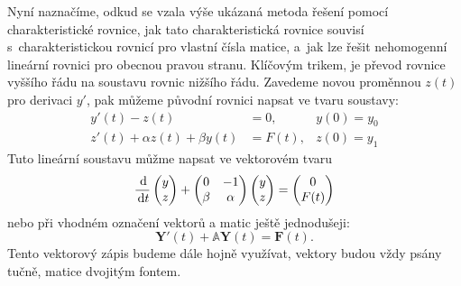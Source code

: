 \documentclass[a4paper, 12pt]{book}
\theoremstyle{definition}
\def\d{\,{\rm d}}               %
\def\vc#1{\mathbf{\boldsymbol{#1}}}     %
\def\tn#1{{\mathbb{#1}}}    %
\begin{document}
Nyní naznačíme, odkud se vzala výše ukázaná metoda řešení pomocí charakteristické rovnice, jak tato charakteristická rovnice souvisí s~charakteristickou rovnicí pro vlastní čísla matice,
a~jak lze řešit nehomogenní lineární rovnici pro obecnou pravou stranu. Klíčovým trikem, je převod rovnice vyššího řádu na soustavu rovnic nižšího řádu. Zavedeme novou proměnnou $z(t)$ pro derivaci $y'$,
pak můžeme původní rovnici napsat ve tvaru soustavy:
\begin{align}
   y'(t) - z(t) &= 0, & y(0) = y_0\\
   z'(t) + \alpha z(t) + \beta y(t) &= F(t), & z(0)= y_1
\end{align}
Tuto lineární soustavu můžme napsat ve vektorovém tvaru
\[
    \frac{\d}{\d t}    
    \begin{pmatrix}
       y \\ z
    \end{pmatrix}
    +
    \begin{pmatrix}
        0  & -1\\
        \beta & \alpha
    \end{pmatrix}
    \begin{pmatrix}
        y \\ z
    \end{pmatrix}
    =
    \begin{pmatrix}
     0 \\ F(t)
    \end{pmatrix}
\]
nebo při vhodném označení vektorů a matic ještě jednodušeji:
\[
    \vc Y'(t) + \tn A \vc Y(t) = \vc F(t).
\]
Tento vektorový zápis budeme dále hojně využívat, vektory budou vždy psány tučně, matice dvojitým fontem.



\end{document}
